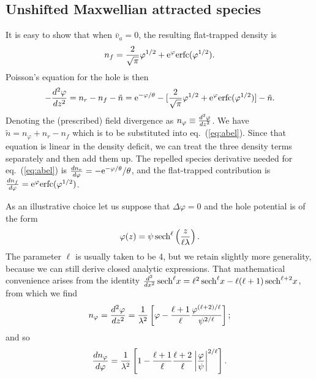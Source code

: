 \documentclass[aip,pop,article-title]{revtex4-2}
\def\etothe#1{{\rm e}^{#1}}
\def\sech{{\,\rm sech}}
\begin{document}
\subsection{Unshifted Maxwellian attracted species}
It is easy to show\cite{Hutchinson2017}
that when $\bar v_a=0$, the resulting flat-trapped density is
\begin{equation}
  \label{eq:nft}
  n_f=  {2\over \sqrt{\pi}}\varphi ^{1/2}+
  \etothe{\varphi }{\rm erfc}(\varphi ^{1/2}).
\end{equation}
Poisson's equation for the hole is then
\begin{equation}
  \label{eq:Poisson2}
  -{d^2\varphi \over dz^2} = n_r-n_f-\tilde n
  = \etothe{-\varphi /\theta}- [{2\over \sqrt{\pi}}\varphi ^{1/2}+
  \etothe{\varphi }{\rm erfc}(\varphi ^{1/2})] -\tilde n.
\end{equation}
Denoting the (prescribed) field divergence as
$n_\varphi\equiv{d^2\varphi \over dz^2}$. We have
$\tilde n= n_\varphi+n_r-n_f$ which is to be substituted into eq.\
(\ref{eq:abel}). Since that equation is linear in the density
deficit, we can treat the three density terms separately and then add
them up. The repelled species derivative needed for eq.\ (\ref{eq:abel})  is
${dn_r\over d\varphi }= -\etothe{-\varphi /\theta}/\theta$, and the
flat-trapped contribution is
${dn_f\over d\varphi }= \etothe{\varphi }{\rm erfc}(\varphi ^{1/2})$.

As an illustrative choice let us suppose that $\Delta \varphi=0$ and the
hole potential is of the form
\begin{equation}
  \label{eq:potl}
  \varphi(z) = \psi \sech^\ell\left({z\over\ell\lambda}\right).
\end{equation}
The parameter $\ell$ is usually taken to be 4, but we retain
slightly more generality, because we can still derive closed analytic
expressions. That mathematical convenience arises from the identity
${d^2\over dx^2} \sech^\ell x = \ell^2\sech^\ell x
-\ell(\ell+1)\sech^{\ell+2}x$, from which we find
\begin{equation}
  \label{eq:diverg}
  n_\varphi={d^2\varphi \over dz^2}={1\over \lambda^2}\left[
    \varphi  -{\ell+1\over \ell}{\varphi ^{(\ell+2)/\ell}\over {\psi}^{2/\ell}}
  \right];
\end{equation}
and so
\begin{equation}
  \label{eq:derivdiv}
  {d n_\varphi\over d\varphi }={1\over \lambda^2}\left[
    1 -{\ell+1\over \ell}{\ell+2\over \ell}\left|\varphi\over \psi\right|^{2/\ell}
  \right].
\end{equation}
\end{document}
